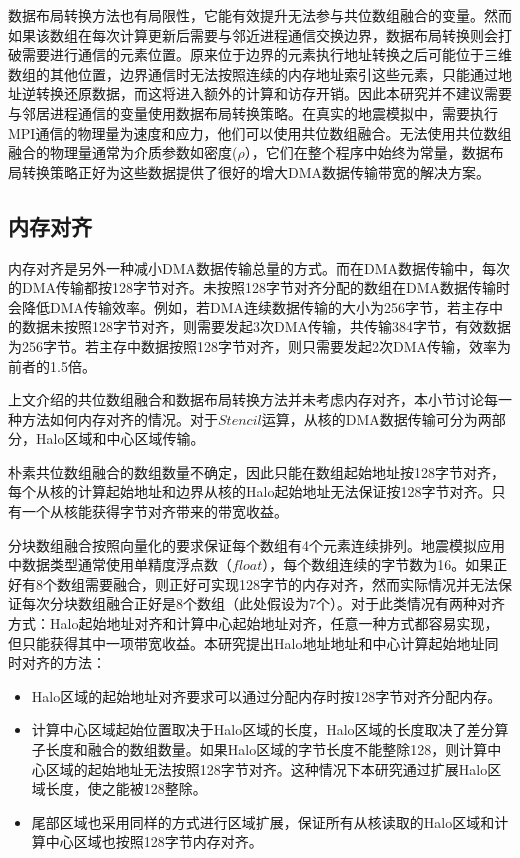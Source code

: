 数据布局转换方法也有局限性，它能有效提升无法参与共位数组融合的变量。然而如果该数组在每次计算更新后需要与邻近进程通信交换边界，数据布局转换则会打破需要进行通信的元素位置。原来位于边界的元素执行地址转换之后可能位于三维数组的其他位置，边界通信时无法按照连续的内存地址索引这些元素，只能通过地址逆转换还原数据，而这将进入额外的计算和访存开销。因此本研究并不建议需要与邻居进程通信的变量使用数据布局转换策略。在真实的地震模拟中，需要执行MPI通信的物理量为速度和应力，他们可以使用共位数组融合。无法使用共位数组融合的物理量通常为介质参数如密度($\rho$），它们在整个程序中始终为常量，数据布局转换策略正好为这些数据提供了很好的增大DMA数据传输带宽的解决方案。

\subsection{内存对齐}

内存对齐是另外一种减小DMA数据传输总量的方式。而在DMA数据传输中，每次的DMA传输都按128字节对齐。未按照128字节对齐分配的数组在DMA数据传输时会降低DMA传输效率。例如，若DMA连续数据传输的大小为256字节，若主存中的数据未按照128字节对齐，则需要发起3次DMA传输，共传输384字节，有效数据为256字节。若主存中数据按照128字节对齐，则只需要发起2次DMA传输，效率为前者的1.5倍。

上文介绍的共位数组融合和数据布局转换方法并未考虑内存对齐，本小节讨论每一种方法如何内存对齐的情况。对于$Stencil$运算，从核的DMA数据传输可分为两部分，Halo区域和中心区域传输。

朴素共位数组融合的数组数量不确定，因此只能在数组起始地址按128字节对齐，每个从核的计算起始地址和边界从核的Halo起始地址无法保证按128字节对齐。只有一个从核能获得字节对齐带来的带宽收益。

分块数组融合按照向量化的要求保证每个数组有4个元素连续排列。地震模拟应用中数据类型通常使用单精度浮点数（$float$），每个数组连续的字节数为16。如果正好有8个数组需要融合，则正好可实现128字节的内存对齐，然而实际情况并无法保证每次分块数组融合正好是8个数组（此处假设为7个）。对于此类情况有两种对齐方式：Halo起始地址对齐和计算中心起始地址对齐，任意一种方式都容易实现，但只能获得其中一项带宽收益。本研究提出Halo地址地址和中心计算起始地址同时对齐的方法：
\begin{itemize}
  \item Halo区域的起始地址对齐要求可以通过分配内存时按128字节对齐分配内存。
  \item 计算中心区域起始位置取决于Halo区域的长度，Halo区域的长度取决了差分算子长度和融合的数组数量。如果Halo区域的字节长度不能整除128，则计算中心区域的起始地址无法按照128字节对齐。这种情况下本研究通过扩展Halo区域长度，使之能被128整除。
  \item 尾部区域也采用同样的方式进行区域扩展，保证所有从核读取的Halo区域和计算中心区域也按照128字节内存对齐。
\end{itemize}

